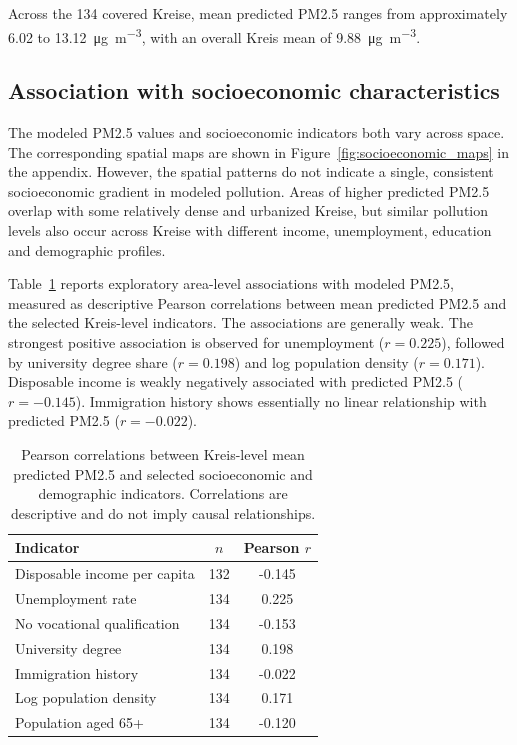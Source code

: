 \documentclass[english, a4paper]{article}
\begin{document}
Across the 134 covered Kreise, mean predicted PM2.5 ranges from approximately
6.02 to 13.12~\si{\micro\gram\per\cubic\meter}, with an overall Kreis mean of
9.88~\si{\micro\gram\per\cubic\meter}.

\subsection{Association with socioeconomic characteristics}

The modeled PM2.5 values and socioeconomic indicators both vary across space.
The corresponding spatial maps are shown in Figure~\ref{fig:socioeconomic_maps} in the appendix.
However, the spatial patterns do not indicate a single, consistent
socioeconomic gradient in modeled pollution. Areas of higher predicted PM2.5
overlap with some relatively dense and urbanized Kreise, but similar pollution
levels also occur across Kreise with different income, unemployment, education
and demographic profiles. 

Table~\ref{tab:pm25_socioeconomic_correlations} reports exploratory area-level
associations with modeled PM2.5, measured as descriptive Pearson correlations
between mean predicted PM2.5 and the selected Kreis-level indicators. The associations are generally weak. The strongest positive
association is observed for unemployment ($r=0.225$), followed by university
degree share ($r=0.198$) and log population density ($r=0.171$). Disposable
income is weakly negatively associated with predicted PM2.5 ($r=-0.145$).
Immigration history shows essentially no linear relationship with predicted
PM2.5 ($r=-0.022$).

\begin{table}[ht]
\centering
\caption{Pearson correlations between Kreis-level mean predicted PM2.5 and
selected socioeconomic and demographic indicators. Correlations are
descriptive and do not imply causal relationships.}
\label{tab:pm25_socioeconomic_correlations}
\begin{tabular}{lcc}
\toprule
\textbf{Indicator} & \textbf{$n$} & \textbf{Pearson $r$} \\
\midrule
Disposable income per capita      & 132 & -0.145 \\
Unemployment rate                 & 134 &  0.225 \\
No vocational qualification       & 134 & -0.153 \\
University degree                 & 134 &  0.198 \\
Immigration history               & 134 & -0.022 \\
Log population density            & 134 &  0.171 \\
Population aged 65+               & 134 & -0.120 \\
\bottomrule
\end{tabular}
\end{table}
\end{document}
